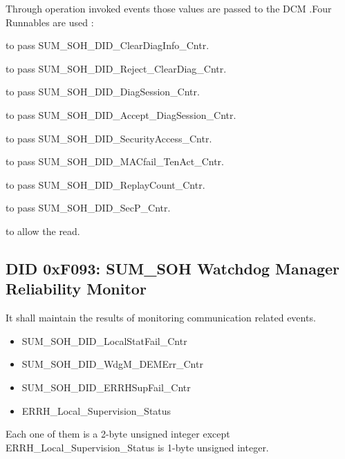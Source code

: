 Through operation invoked events those values are passed to the DCM .Four Runnables are used :

{
\textbf{} to pass  SUM\_SOH\_DID\_ClearDiagInfo\_Cntr.
}
{
}

{
\textbf{} to pass  SUM\_SOH\_DID\_Reject\_ClearDiag\_Cntr.
}
{
}

{
\textbf{} to pass  SUM\_SOH\_DID\_DiagSession\_Cntr.
}
{
}

{
\textbf{} to pass  SUM\_SOH\_DID\_Accept\_DiagSession\_Cntr.
}
{
}

{
\textbf{} to pass  SUM\_SOH\_DID\_SecurityAccess\_Cntr.
}
{
}

{
\textbf{} to pass  SUM\_SOH\_DID\_MACfail\_TenAct\_Cntr.
}
{
}

{
\textbf{} to pass  SUM\_SOH\_DID\_ReplayCount\_Cntr.
}
{
}

{
\textbf{} to pass  SUM\_SOH\_DID\_SecP\_Cntr.
}
{
}

{
\textbf{} to allow the read.
}
{
}

\subsection{DID 0xF093: SUM_SOH Watchdog Manager Reliability Monitor}

{
It shall maintain the results of monitoring communication related events.

\begin{itemize}
\item	SUM\_SOH\_DID\_LocalStatFail\_Cntr
\item	SUM\_SOH\_DID\_WdgM_DEMErr\_Cntr
\item	SUM\_SOH\_DID\_ERRHSupFail\_Cntr
\item	ERRH\_Local\_Supervision\_Status
\end{itemize}
Each one of them is a 2-byte unsigned integer except ERRH\_Local\_Supervision\_Status is 1-byte unsigned integer.\newline

}
{
}

